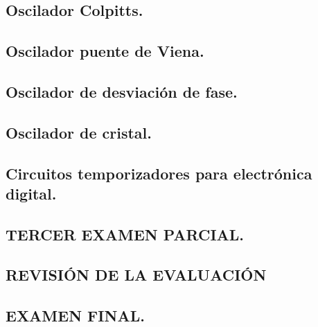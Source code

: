 \documentclass{myarticle}
\begin{document}
\subsection*{Oscilador Colpitts.}
\subsection*{Oscilador puente de Viena.}
\subsection*{Oscilador de desviación de fase.}
\subsection*{Oscilador de cristal.}
\subsection*{Circuitos temporizadores para electrónica digital.}
\subsection*{{\bf TERCER EXAMEN PARCIAL.}}
\subsection*{{\bf REVISIÓN DE LA EVALUACIÓN}}
\subsection*{{\bf EXAMEN FINAL.}}
\end{document}

